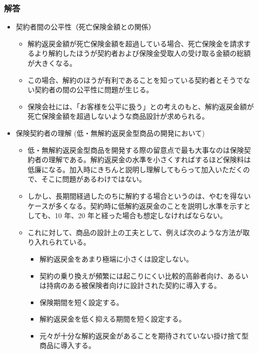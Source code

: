 \documentclass[report,gutter=10mm,fore-edge=10mm,uplatex,dvipdfmx]{jlreq}
\begin{document}
\subsubsection{解答}
  \begin{itemize}
    \item 契約者間の公平性（死亡保険金額との関係）
    \begin{itemize}
      \item 解約返戻金額が死亡保険金額を超過している場合、死亡保険金を請求するより解約したほうが契約者および保険金受取人の受け取る金額の総額が大きくなる。
      \item この場合、解約のほうが有利であることを知っている契約者とそうでない契約者の間の公平性に問題が生じる。
      \item 保険会社には、「お客様を公平に扱う」との考えのもと、解約返戻金額が死亡保険金額を超過しないような商品設計が求められる。
    \end{itemize}
    \item 保険契約者の理解 (低・無解約返戻金型商品の開発において)
    \begin{itemize}
      \item 低・無解約返戻金型商品を開発する際の留意点で最も大事なのは保険契約者の理解である。解約返戻金の水準を小さくすればするほど保険料は低廉になる。加入時にきちんと説明し理解してもらって加入いただくので、そこに問題があるわけではない。
      \item しかし、長期間経過したのちに解約する場合というのは、やむを得ないケースが多くなる。契約時に低解約返戻金のことを説明し水準を示すとしても、10 年、20 年と経った場合も想定しなければならない。
      \item これに対して、商品の設計上の工夫として、例えば次のような方法が取り入れられている。
      \begin{itemize}
        \item 解約返戻金をあまり極端に小さくは設定しない。
        \item 契約の乗り換えが頻繁には起こりにくい比較的高齢者向け、あるいは持病のある被保険者向けに設計された契約に導入する。
        \item 保険期間を短く設定する。
        \item 解約返戻金を低く抑える期間を短く設定する。
        \item 元々が十分な解約返戻金があることを期待されていない掛け捨て型商品に導入する。
      \end{itemize}
    \end{itemize}
  \end{itemize}
\end{document}
